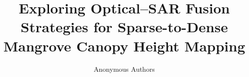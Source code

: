 \documentclass[10pt,twocolumn,letterpaper]{article}
\title{Exploring Optical--SAR Fusion Strategies for Sparse-to-Dense Mangrove Canopy Height Mapping}
\author{Anonymous Authors}
\begin{document}
\maketitle








{\small}
\end{document}
